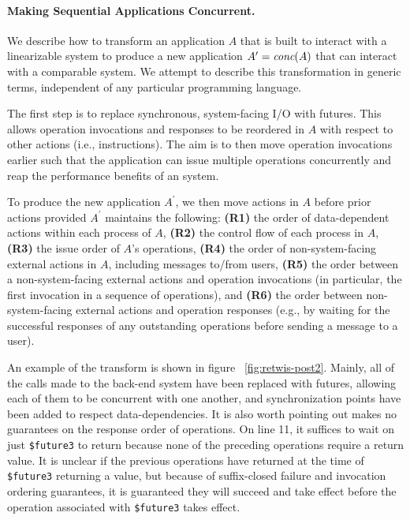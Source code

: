 \paragraph{Making Sequential Applications Concurrent.}
\label{sec:mdl:transform}

We describe how to transform an application $A$ that is built to
interact with a linearizable system to produce a new application
$A^\prime = \operatorname*{\textit{conc}}(A)$ that can interact with a comparable \MDL{} system.
We attempt to describe this transformation in generic terms, independent of any particular programming language.

The first step is to replace synchronous, system-facing I/O with
futures. This allows operation invocations and responses
to be reordered in $A$ with respect to other actions (i.e., instructions).
The aim is to then move operation invocations earlier such that the application
can issue multiple operations concurrently and reap the performance benefits 
of an \MDL{} system.

To produce the new application $A^\prime$, we then move actions in $A$ before prior 
actions provided $A^\prime$ maintains the following:
\textbf{(R1)} the order of data-dependent actions within
each process of $A$,
\textbf{(R2)} the control flow of each process in $A$,
\textbf{(R3)} the issue order of $A$'s operations,
\textbf{(R4)} the order of non-system-facing external
actions in $A$, including messages to/from users,
\textbf{(R5)} the order between a non-system-facing external 
actions and operation invocations (in particular, the first invocation in a
sequence of operations), and
\textbf{(R6)} the order between non-system-facing external actions and operation responses (e.g., by waiting for the successful responses of any outstanding operations before sending a message to a user).

An example of the transform is shown in figure ~\ref{fig:retwis-post2}. Mainly, all of the calls made to the back-end system have been replaced with futures, allowing each of them to be concurrent with one another, and synchronization points have been added to respect data-dependencies. It is also worth pointing out \mdl{} makes no guarantees on the response order of operations. On line 11, it suffices to wait on just \texttt{\$future3} to return because none of the preceding operations require a return value. It is unclear if the previous operations have returned at the time of \texttt{\$future3} returning a value, but because of suffix-closed failure and invocation ordering guarantees, it is guaranteed they will succeed and take effect before the operation associated with \texttt{\$future3} takes effect.

